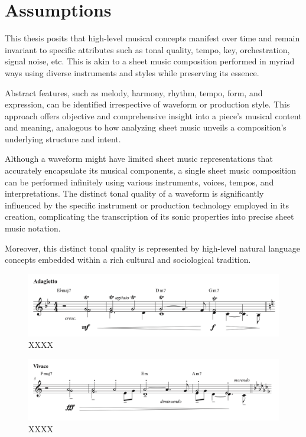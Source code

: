 \section{Assumptions}

This thesis posits that high-level musical concepts manifest over time and remain invariant to specific attributes such as tonal quality, tempo, key, orchestration, signal noise, etc. This is akin to a sheet music composition performed in myriad ways using diverse instruments and styles while preserving its essence.

Abstract features, such as melody, harmony, rhythm, tempo, form, and expression, can be identified irrespective of waveform or production style. This approach offers objective and comprehensive insight into a piece's musical content and meaning, analogous to how analyzing sheet music unveils a composition's underlying structure and intent.

Although a waveform might have limited sheet music representations that accurately encapsulate its musical components, a single sheet music composition can be performed infinitely using various instruments, voices, tempos, and interpretations. The distinct tonal quality of a waveform is significantly influenced by the specific instrument or production technology employed in its creation, complicating the transcription of its sonic properties into precise sheet music notation.

Moreover, this distinct tonal quality is represented by high-level natural language concepts embedded within a rich cultural and sociological tradition.

\begin{figure}[h]
\includegraphics[clip,width=\columnwidth]{figures/images/sheet1.png}%
\caption{\small{XXXX}}
\label{fig: Sheet music aug 1}
\end{figure}

\begin{figure}[h]
\includegraphics[clip,width=\columnwidth]{figures/images/sheet2.png}%
\caption{\small{XXXX}}
\label{fig: Sheet music aug 2}
\end{figure}

